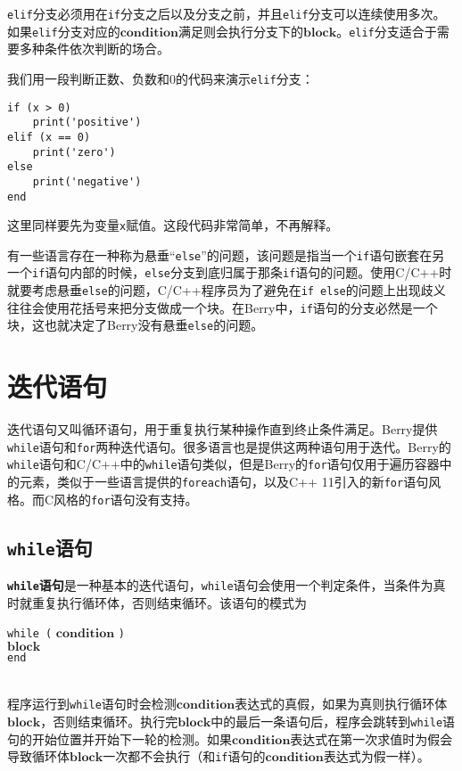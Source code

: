 \texttt{elif}分支必须用在\texttt{if}分支之后以及分支之前，并且\texttt{elif}分支可以连续使用多次。如果\texttt{elif}分支对应的$\bm{condition}$满足则会执行分支下的$\bm{block}$。\texttt{elif}分支适合于需要多种条件依次判断的场合。

我们用一段判断正数、负数和0的代码来演示\texttt{elif}分支：
\begin{lstlisting}[language=berry, numbers=none]
if (x > 0)
    print('positive')
elif (x == 0)
    print('zero')
else
    print('negative')
end
\end{lstlisting}
这里同样要先为变量\texttt{x}赋值。这段代码非常简单，不再解释。

有一些语言存在一种称为悬垂``\texttt{else}''的问题，该问题是指当一个\texttt{if}语句嵌套在另一个\texttt{if}语句内部的时候，\texttt{else}分支到底归属于那条\texttt{if}语句的问题。使用C/C++时就要考虑悬垂\texttt{else}的问题，C/C++程序员为了避免在\texttt{if else}的问题上出现歧义往往会使用花括号来把分支做成一个块。在Berry中，\texttt{if}语句的分支必然是一个块，这也就决定了Berry没有悬垂\texttt{else}的问题。

\section{迭代语句}

迭代语句又叫循环语句，用于重复执行某种操作直到终止条件满足。Berry提供\texttt{while}语句和\texttt{for}两种迭代语句。很多语言也是提供这两种语句用于迭代。Berry的\texttt{while}语句和C/C++中的\texttt{while}语句类似，但是Berry的\texttt{for}语句仅用于遍历容器中的元素，类似于一些语言提供的\texttt{foreach}语句，以及C++ 11引入的新\texttt{for}语句风格。而C风格的\texttt{for}语句没有支持。

\subsection{\texttt{while}语句}

\textbf{\texttt{while}语句}是一种基本的迭代语句，\texttt{while}语句会使用一个判定条件，当条件为真时就重复执行循环体，否则结束循环。该语句的模式为
\begin{algorithm}
    \texttt{while (} $\bm{condition}$ \texttt{)} \\
        \qquad $\bm{block}$ \\
    \texttt{end}
\end{algorithm}\vspace{-0.6em}\\
程序运行到\texttt{while}语句时会检测$\bm{condition}$表达式的真假，如果为真则执行循环体$\bm{block}$，否则结束循环。执行完$\bm{block}$中的最后一条语句后，程序会跳转到\texttt{while}语句的开始位置并开始下一轮的检测。如果$\bm{condition}$表达式在第一次求值时为假会导致循环体$\bm{block}$一次都不会执行（和\texttt{if}语句的$\bm{condition}$表达式为假一样）。

